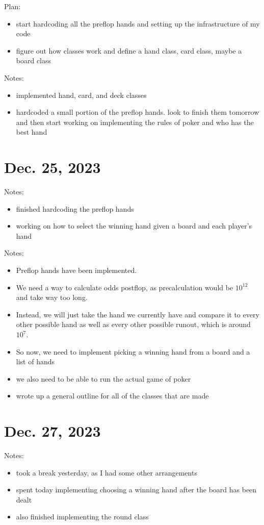 \documentclass{article}
\begin{document}
Plan:
\begin{itemize}
    \item start hardcoding all the preflop
hands and setting up the infrastructure of 
my code
    \item figure out how classes work and
define a hand class, card class, maybe a 
board class
\end{itemize}

\noindent
Notes:
\begin{itemize}
    \item implemented hand, card, and deck 
classes
    \item hardcoded a small portion of the 
preflop hands. look to finish them tomorrow
and then start working on implementing the 
rules of poker and who has the best hand
\end{itemize}

\section{Dec. 25, 2023}
Notes:
\begin{itemize}
    \item finished hardcoding the preflop 
hands
    \item working on how to select the 
winning hand given a board and each player's 
hand
\end{itemize}

\noindent
Notes:
\begin{itemize}
    \item Preflop hands have been implemented.
    \item We need a way to calculate odds 
postflop, as precalculation would be $10^{12}$ 
and take way too long.
    \item Instead, we will just take the hand 
we currently have and compare it to every other
possible hand as well as every other possible 
runout, which is around $10^7$.
    \item So now, we need to implement picking 
a winning hand from a board and a list of hands
    \item we also need to be able to run the
actual game of poker
    \item wrote up a general outline for all of 
the classes that are made
\end{itemize}

\section{Dec. 27, 2023}
Notes:
\begin{itemize}
    \item took a break yesterday, as I had some 
other arrangements
    \item spent today implementing choosing a 
winning hand after the board has been dealt
    \item also finished implementing the round
class
\end{itemize}
\end{document}
